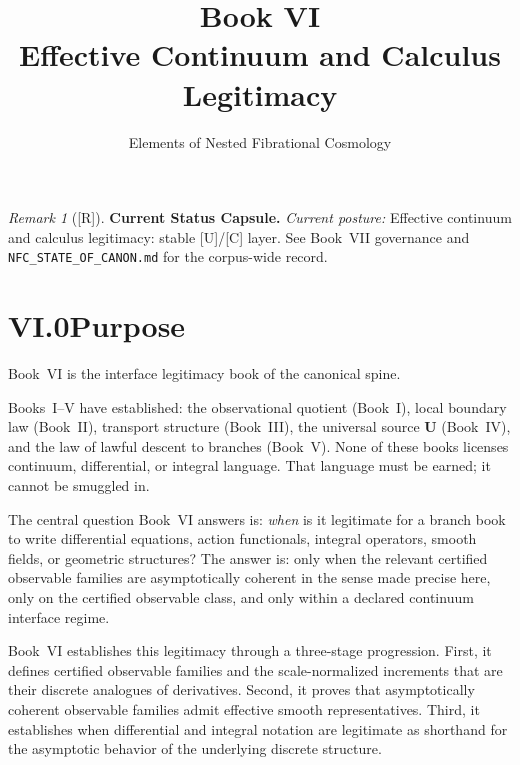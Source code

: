 \documentclass[12pt,oneside]{amsbook}
\theoremstyle{plain}
\theoremstyle{definition}
\theoremstyle{remark}
\newtheorem{remark}[theorem]{Remark}
\newcommand{\status}[1]{\textup{[#1]}}
\begin{document}
\title{Book VI\\[6pt]Effective Continuum and Calculus Legitimacy}
\author{Elements of Nested Fibrational Cosmology}
\date{}
\maketitle

\tableofcontents

\bigskip


\begin{remark}[\status{R}]\label{cap:book6-status}
\textbf{Current Status Capsule.} \emph{Current posture:} Effective continuum and calculus legitimacy: stable [U]/[C] layer. See Book~VII governance and \texttt{NFC\_STATE\_OF\_CANON.md} for the corpus-wide record.
\end{remark}

\section*{VI.0\quad Purpose}

Book~VI is the interface legitimacy book of the canonical spine.

Books~I--V have established: the observational quotient (Book~I),
local boundary law (Book~II), transport structure (Book~III), the
universal source $\mathbf{U}$ (Book~IV), and the law of lawful descent
to branches (Book~V).  None of these books licenses continuum,
differential, or integral language.  That language must be earned; it
cannot be smuggled in.

The central question Book~VI answers is: \emph{when} is it legitimate
for a branch book to write differential equations, action functionals,
integral operators, smooth fields, or geometric structures?  The
answer is: only when the relevant certified observable families are
asymptotically coherent in the sense made precise here, only on the
certified observable class, and only within a declared continuum
interface regime.

Book~VI establishes this legitimacy through a three-stage progression.
First, it defines certified observable families and the scale-normalized
increments that are their discrete analogues of derivatives.  Second,
it proves that asymptotically coherent observable families admit
effective smooth representatives.  Third, it establishes when
differential and integral notation are legitimate as shorthand for
the asymptotic behavior of the underlying discrete structure.
\end{document}
